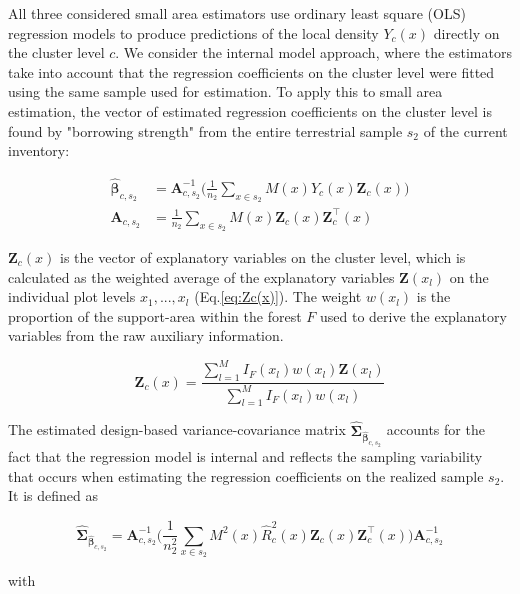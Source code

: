 All three considered small area estimators use ordinary least square (OLS) regression models to produce predictions of the local density $Y_{c}(x)$ directly on the cluster level $c$. We consider the internal model approach, where the estimators take into account that the regression coefficients on the cluster level were fitted using the same sample used for estimation. To apply this to small area estimation, the vector of estimated regression coefficients on the cluster level is found by "borrowing strength" from the entire terrestrial sample $s_2$ of the current inventory:

\begin{subequations}\label{normequ_simple_cluster}
	\begin{align}
\hat{\pmb{\beta}}_{c,s_2} &= \pmb{A}_{c,s_2}^{-1} \Big(\frac{1}{n_2}\sum_{x\in{s_2}}M(x)Y_{c}(x)\pmb{Z}_{c}(x)\Big) \\
\pmb{A}_{c,s_2} &=\frac{1}{n_2}\sum_{x\in{s_2}}M(x)\pmb{Z}_{c}(x)\pmb{Z}_{c}^{\top}(x)
	\end{align}
\end{subequations}

\noindent $\pmb{Z}_{c}(x)$ is the vector of explanatory variables on the cluster level, which is calculated as the weighted average of the explanatory variables $\pmb{Z}(x_l)$ on the individual plot levels $x_1, ..., x_l$ (Eq.\ref{eq:Zc(x)}). The weight $w(x_l)$ is the proportion of the support-area within the forest $F$ used to derive the explanatory variables from the raw auxiliary information.

\begin{equation}\label{eq:Zc(x)}
\pmb{Z}_{c}(x)=\frac{\sum_{l=1}^{M}I_{F}(x_l)w(x_l)\pmb{Z}(x_l)}{\sum_{l=1}^{M}I_{F}(x_l)w(x_l)}
\end{equation}

\noindent The estimated design-based variance-covariance matrix $\hat{\pmb{\Sigma}}_{\hat{\pmb{\beta}}_{c,s_2}}$ accounts for the fact that the regression model is internal and reflects the sampling variability that occurs when estimating the regression coefficients on the realized sample $s_2$. It is defined as

\begin{equation}\label{eq:varcovarbeta}
\hat{\pmb{\Sigma}}_{\hat{\pmb{\beta}}_{c,s_2}}=\pmb{A}_{c,s_2}^{-1}
\Big(\frac{1}{n_2^2}\sum_{x\in{s_2}}M^{2}(x)\hat{R}_{c}^2(x)\pmb{Z}_{c}(x)\pmb{Z}_{c}^{\top}(x)\Big)
\pmb{A}_{c,s_2}^{-1}
\end{equation}

\noindent with 

